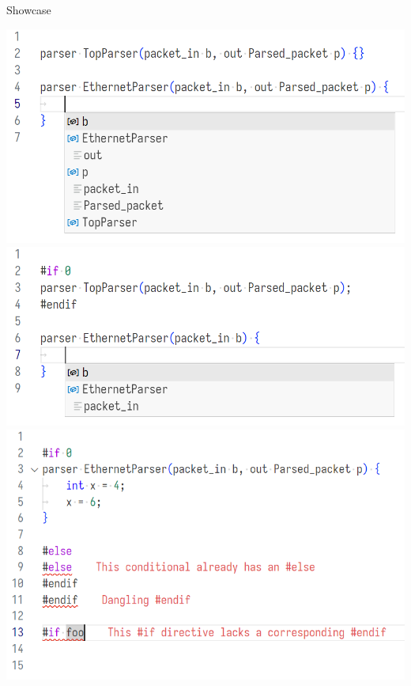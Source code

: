 \documentclass[aspectratio=169]{beamer}
\begin{document}
\begin{frame}{Showcase}
	\begin{overprint}
	 {
		\includegraphics[width=\textwidth]{resources/p4analyzer-autocompletion.png}
	}
	\only<2> {
		\includegraphics[width=\textwidth]{resources/p4analyzer-preprocessor-response.png}
	}
	\only<3> {
		\includegraphics[width=\textwidth]{resources/p4analyzer-preprocessor-errors.png}
	}
	\end{overprint}
\end{frame}
\end{document}
